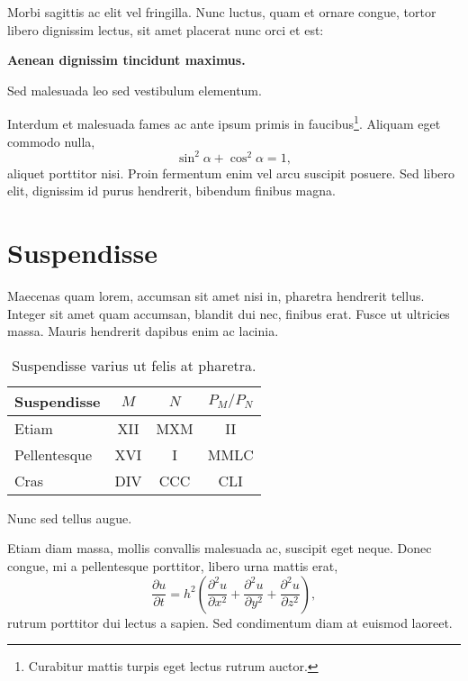 \documentclass[a4paper,12pt]{article}
\begin{document}
Morbi sagittis ac elit vel fringilla. Nunc luctus, quam et ornare
congue, tortor libero dignissim lectus, sit amet placerat nunc orci et
est:
%
\begin{center}
  \textbf{Aenean dignissim tincidunt maximus.}
\end{center}
%
Sed malesuada leo sed vestibulum elementum.


Interdum et malesuada fames ac ante ipsum primis in
faucibus\footnote{Curabitur mattis turpis eget lectus rutrum 
auctor.}. Aliquam eget commodo nulla, 
%
\begin{equation}
  \label{eq:2}
  \sin^2 \alpha + \cos^2 \alpha = 1,
\end{equation}
%
aliquet porttitor nisi. Proin fermentum enim vel arcu suscipit
posuere. Sed libero elit, dignissim id purus hendrerit, bibendum
finibus magna. 


\section{Suspendisse}
\label{sec:suspendisse}


Maecenas quam lorem, accumsan sit amet nisi in, pharetra hendrerit
tellus. Integer sit amet quam accumsan, blandit dui nec, finibus
erat. Fusce ut ultricies massa. Mauris hendrerit dapibus enim ac
lacinia.
%
\begin{table}[h]
%
  \begin{center}
%
    \begin{tabular}{|l|c|c|c|}
      \hline
      Suspendisse  & $M$ & $N$ & $P_M/P_N$ \\
      \hline
      Etiam        & XII & MXM & II        \\
      \hline
      Pellentesque & XVI & I   & MMLC      \\
      \hline
      Cras         & DIV & CCC & CLI       \\
      \hline
    \end{tabular}
%
    \caption{\label{tab:1} Suspendisse varius ut felis at pharetra.} 
%
  \end{center}
%
\end{table}
%
Nunc sed tellus augue.


Etiam diam massa, mollis convallis malesuada ac, suscipit eget
neque. Donec congue, mi a pellentesque porttitor, libero urna mattis
erat, 
%
\begin{displaymath}
  \frac{\partial u}{\partial t}
    = h^2 \left(
            \frac{\partial^2 u}{\partial x^2} +
            \frac{\partial^2 u}{\partial y^2} +
            \frac{\partial^2 u}{\partial z^2}
          \right), 
\end{displaymath}
%
rutrum porttitor dui lectus a sapien. Sed condimentum diam at
euismod laoreet.
\end{document}
